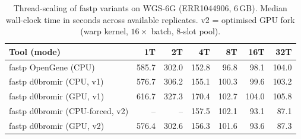 \documentclass[a4paper,12pt]{article}
\begin{document}
\begin{table}[H]
  \centering
  \caption{Thread-scaling of fastp variants on WGS-6G (ERR1044906, 6\,GB).
    Median wall-clock time in seconds across available replicates.
    v2 = optimised GPU fork (warp kernel, $16\times$ batch, 8-slot pool).}
  \label{tab:scaling}
  \begin{tabular}{lrrrrrr}
    \toprule
    \textbf{Tool (mode)} & \textbf{1T} & \textbf{2T} & \textbf{4T} & \textbf{8T} & \textbf{16T} & \textbf{32T} \\
    \midrule
    fastp OpenGene (CPU)        & 585.7 & 302.0 & 152.8 &  96.8 &  98.1 & 104.0 \\
    fastp d0bromir (CPU, v1)    & 576.7 & 306.2 & 155.1 & 100.3 &  99.6 & 103.2 \\
    fastp d0bromir (GPU, v1)    & 616.7 & 327.3 & 170.4 & 102.7 & 104.0 & 105.8 \\
    fastp d0bromir (CPU-forced, v2) & -- & -- & 157.5 & 102.1 &  93.1 &  87.1 \\
    fastp d0bromir (GPU, v2)    & 576.4 & 302.6 & 156.3 & 101.6 &  93.6 &  87.3 \\
    \bottomrule
  \end{tabular}
\end{table}
\end{document}
